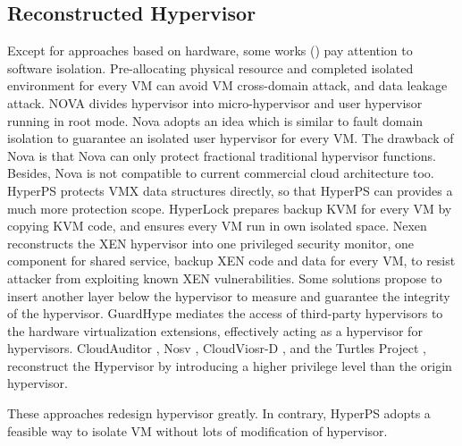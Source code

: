 \subsection{Reconstructed Hypervisor}
Except for approaches based on hardware, some works (\cite{shi2017deconstructing}\cite{shi2017deconstructing}\cite{hyperlock}) pay attention to software isolation. Pre-allocating physical resource and completed isolated environment for every VM can avoid VM cross-domain attack, and data leakage attack. NOVA\cite{shi2017deconstructing} divides hypervisor into micro-hypervisor and user hypervisor running in root mode. Nova adopts an idea which is similar to fault domain isolation to guarantee an isolated user hypervisor for every VM. The drawback of Nova is that Nova can only protect fractional traditional hypervisor functions. Besides, Nova is not compatible to current commercial cloud architecture too. HyperPS protects VMX data structures directly, so that HyperPS can provides a much more protection scope. 
HyperLock \cite{hyperlock} prepares backup KVM for every VM by copying KVM code, and ensures every VM run in own isolated space. 
Nexen\cite{shi2017deconstructing} reconstructs the XEN hypervisor into one privileged security monitor, one component for shared service, backup XEN code and data for every VM, to resist attacker from exploiting known XEN vulnerabilities.
Some solutions\cite{ben2010turtles,strackx2012fides} propose to insert another layer below the hypervisor to measure and guarantee the integrity of the hypervisor. GuardHype\cite{carbone2008taming} mediates the access of third-party hypervisors to the hardware virtualization extensions, effectively acting as a hypervisor for hypervisors. CloudAuditor \cite{Wang2016CloudAuditorAC}, Nosv \cite{REN2017137}, CloudViosr-D \cite{mi2020mostly}, and the Turtles Project \cite{183330}, reconstruct the Hypervisor by introducing a higher privilege level than the origin hypervisor. 

These approaches redesign hypervisor greatly. In contrary, HyperPS adopts a feasible way to isolate VM without lots of modification of hypervisor. 

